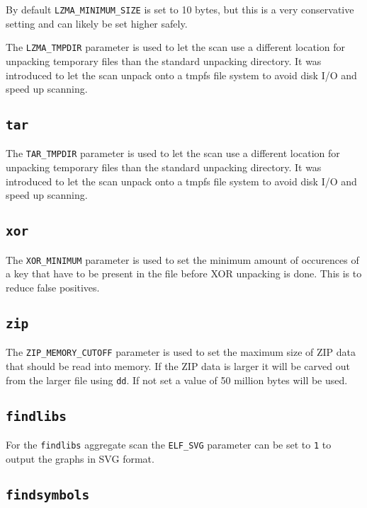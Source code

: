 \documentclass[10pt,a4paper]{article}
\begin{document}
By default \texttt{LZMA\_MINIMUM\_SIZE} is set to 10 bytes, but this is a very
conservative setting and can likely be set higher safely.

The \texttt{LZMA\_TMPDIR} parameter is used to let the scan use a different
location for unpacking temporary files than the standard unpacking directory.
It was introduced to let the scan unpack onto a tmpfs file system to avoid disk
I/O and speed up scanning.

\subsection{\texttt{tar}}

The \texttt{TAR\_TMPDIR} parameter is used to let the scan use a different
location for unpacking temporary files than the standard unpacking directory.
It was introduced to let the scan unpack onto a tmpfs file system to avoid disk
I/O and speed up scanning.

\subsection{\texttt{xor}}

The \texttt{XOR\_MINIMUM} parameter is used to set the minimum amount of
occurences of a key that have to be present in the file before XOR unpacking
is done. This is to reduce false positives.

\subsection{\texttt{zip}}

The \texttt{ZIP\_MEMORY\_CUTOFF} parameter is used to set the maximum size
of ZIP data that should be read into memory. If the ZIP data is larger it will
be carved out from the larger file using \texttt{dd}. If not set a value of 50
million bytes will be used.

\subsection{\texttt{findlibs}}

For the \texttt{findlibs} aggregate scan the \texttt{ELF\_SVG} parameter can be
set to \texttt{1} to output the graphs in SVG format.

\subsection{\texttt{findsymbols}}
\end{document}
